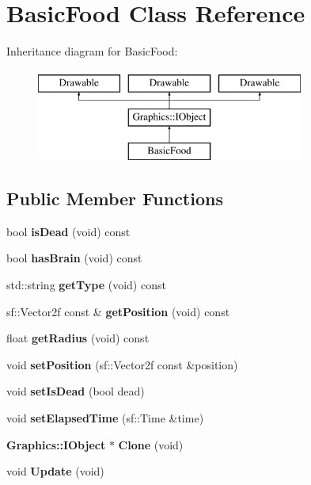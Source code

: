 \section{Basic\+Food Class Reference}
\label{class_basic_food}
Inheritance diagram for Basic\+Food\+:\begin{figure}[H]
\begin{center}
\leavevmode
\includegraphics[height=3.000000cm]{class_basic_food}
\end{center}
\end{figure}
\subsection*{Public Member Functions}
\begin{DoxyCompactItemize}
\item 
bool {\bfseries is\+Dead} (void) const \label{class_basic_food_ad16dfb077944595051d941176b6d7280}

\item 
bool {\bfseries has\+Brain} (void) const \label{class_basic_food_a67120a733b91f4250e583d3b22f24cee}

\item 
std\+::string {\bfseries get\+Type} (void) const \label{class_basic_food_a00281d3c4c2054b11c8fa34231e54785}

\item 
sf\+::\+Vector2f const \& {\bfseries get\+Position} (void) const \label{class_basic_food_acb57fae703132f82b5d00b3fc7a1c6f5}

\item 
float {\bfseries get\+Radius} (void) const \label{class_basic_food_a4976e38ae7f8a09027a3ee019fb0a06b}

\item 
void {\bfseries set\+Position} (sf\+::\+Vector2f const \&position)\label{class_basic_food_a67316c65c88fcfb09f73152573112792}

\item 
void {\bfseries set\+Is\+Dead} (bool dead)\label{class_basic_food_aa8adaa9dcb81a69f04b2566188635a9a}

\item 
void {\bfseries set\+Elapsed\+Time} (sf\+::\+Time \&time)\label{class_basic_food_a3bf45a62ba4e146732a99e2c5928b1c6}

\item 
{\bf Graphics\+::\+I\+Object} $\ast$ {\bfseries Clone} (void)\label{class_basic_food_a24a336ebf4b7f5d3892819c604f5db12}

\item 
void {\bfseries Update} (void)\label{class_basic_food_a9a44d9adfec1bc20db5c71fd84020218}

\end{DoxyCompactItemize}
